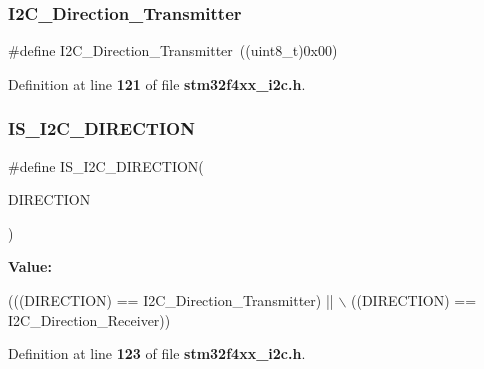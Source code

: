 \subsubsection{I2\+C\+\_\+\+Direction\+\_\+\+Transmitter}
{\footnotesize\ttfamily \#define I2\+C\+\_\+\+Direction\+\_\+\+Transmitter~((uint8\+\_\+t)0x00)}



Definition at line \textbf{ 121} of file \textbf{ stm32f4xx\+\_\+i2c.\+h}.

\mbox{\label{group__I2C__transfer__direction_ga33368efe652bc25b4f4b74f02ce0657e}} 
\subsubsection{I\+S\+\_\+\+I2\+C\+\_\+\+D\+I\+R\+E\+C\+T\+I\+ON}
{\footnotesize\ttfamily \#define I\+S\+\_\+\+I2\+C\+\_\+\+D\+I\+R\+E\+C\+T\+I\+ON(\begin{DoxyParamCaption}\item[{}]{D\+I\+R\+E\+C\+T\+I\+ON }\end{DoxyParamCaption})}

{\bfseries Value\+:}
\begin{DoxyCode}
(((DIRECTION) == I2C_Direction_Transmitter) || \(\backslash\)
                                     ((DIRECTION) == I2C_Direction_Receiver))
\end{DoxyCode}


Definition at line \textbf{ 123} of file \textbf{ stm32f4xx\+\_\+i2c.\+h}.

